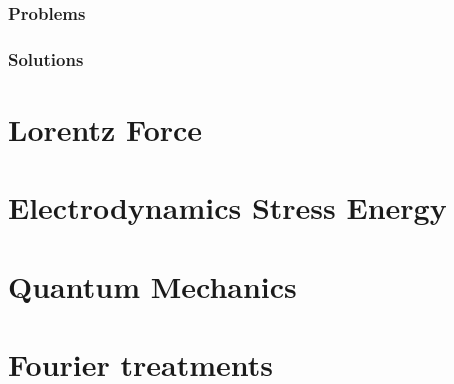       \section{Problems}
         
      \section{Solutions}
         \shipoutAnswer

\part{Lorentz Force}
   
   
   
   
   

\part{Electrodynamics Stress Energy}
   
   
   
   
   
   
   
   
   
   
   

\part{Quantum Mechanics}
   
   
   
   
   
   
   
   

\part{Fourier treatments}
   
   
   
   
   
   
   
   
   
%
%
